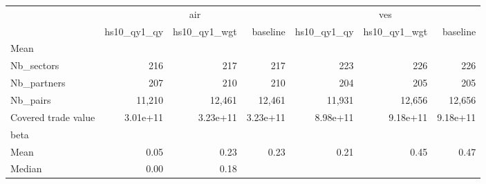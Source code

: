 \begin{tabular}{lllllll}
\cline{1-7}
\multicolumn{1}{c}{} &
  \multicolumn{3}{|c}{air} &
  \multicolumn{3}{c}{ves} \\
\multicolumn{1}{c}{} &
  \multicolumn{1}{|r}{hs10\_qy1\_qy} &
  \multicolumn{1}{r}{hs10\_qy1\_wgt} &
  \multicolumn{1}{r}{baseline} &
  \multicolumn{1}{r}{hs10\_qy1\_qy} &
  \multicolumn{1}{r}{hs10\_qy1\_wgt} &
  \multicolumn{1}{r}{baseline} \\
\cline{1-7}
\multicolumn{1}{l}{Mean} &
  \multicolumn{1}{|r}{} &
  \multicolumn{1}{r}{} &
  \multicolumn{1}{r}{} &
  \multicolumn{1}{r}{} &
  \multicolumn{1}{r}{} &
  \multicolumn{1}{r}{} \\
\multicolumn{1}{l}{\hspace{1em}Nb\_sectors} &
  \multicolumn{1}{|r}{216} &
  \multicolumn{1}{r}{217} &
  \multicolumn{1}{r}{217} &
  \multicolumn{1}{r}{223} &
  \multicolumn{1}{r}{226} &
  \multicolumn{1}{r}{226} \\
\multicolumn{1}{l}{\hspace{1em}Nb\_partners} &
  \multicolumn{1}{|r}{207} &
  \multicolumn{1}{r}{210} &
  \multicolumn{1}{r}{210} &
  \multicolumn{1}{r}{204} &
  \multicolumn{1}{r}{205} &
  \multicolumn{1}{r}{205} \\
\multicolumn{1}{l}{\hspace{1em}Nb\_pairs} &
  \multicolumn{1}{|r}{11,210} &
  \multicolumn{1}{r}{12,461} &
  \multicolumn{1}{r}{12,461} &
  \multicolumn{1}{r}{11,931} &
  \multicolumn{1}{r}{12,656} &
  \multicolumn{1}{r}{12,656} \\
\multicolumn{1}{l}{\hspace{1em}Covered trade value} &
  \multicolumn{1}{|r}{3.01e+11} &
  \multicolumn{1}{r}{3.23e+11} &
  \multicolumn{1}{r}{3.23e+11} &
  \multicolumn{1}{r}{8.98e+11} &
  \multicolumn{1}{r}{9.18e+11} &
  \multicolumn{1}{r}{9.18e+11} \\
\multicolumn{1}{l}{beta} &
  \multicolumn{1}{|r}{} &
  \multicolumn{1}{r}{} &
  \multicolumn{1}{r}{} &
  \multicolumn{1}{r}{} &
  \multicolumn{1}{r}{} &
  \multicolumn{1}{r}{} \\
\multicolumn{1}{l}{\hspace{1em}Mean} &
  \multicolumn{1}{|r}{0.05} &
  \multicolumn{1}{r}{0.23} &
  \multicolumn{1}{r}{0.23} &
  \multicolumn{1}{r}{0.21} &
  \multicolumn{1}{r}{0.45} &
  \multicolumn{1}{r}{0.47} \\
\multicolumn{1}{l}{\hspace{1em}Median} &
  \multicolumn{1}{|r}{0.00} &
  \multicolumn{1}{r}{0.18} &

\end{tabular}

